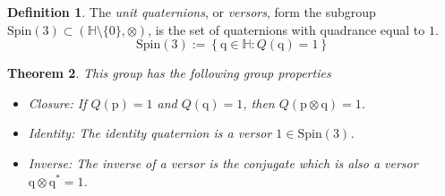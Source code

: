 \documentclass{amsart}
\newtheorem{theorem}{Theorem}[section]
\theoremstyle{definition}
\newtheorem{definition}[theorem]{Definition}
\theoremstyle{remark}
\numberwithin{equation}{section}
\begin{document}
\begin{definition}
  The \emph{unit quaternions}, or \emph{versors}, form the subgroup $\mathrm{Spin}(3) \subset (\mathbb{H}\setminus\{\mathrm{0}\}, \otimes)$, is the set of quaternions with quadrance equal to $1$.
  \begin{equation}
    \mathrm{Spin}(3) := \left\{\mathrm{q} \in \mathbb{H} : Q(\mathrm{q}) = 1\right\}
  \end{equation}
\end{definition}

\begin{theorem}
  This group has the following group properties
  \begin{itemize}
    \item Closure: If $Q(\mathrm{p})=1$ and $Q(\mathrm{q})=1$, then $Q(\mathrm{p}\otimes\mathrm{q})=1$.
    \item Identity: The identity quaternion is a versor $\mathrm{1}\in\mathrm{Spin}(3)$.
    \item Inverse: The inverse of a versor is the conjugate which is also a versor $\mathrm{q} \otimes \mathrm{q}^* = \mathrm{1}$.
  \end{itemize}
\end{theorem}
\end{document}

